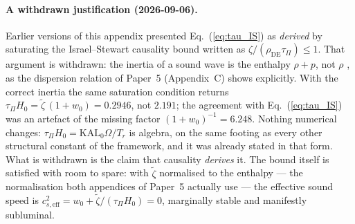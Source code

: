 \paragraph{A withdrawn justification (2026-09-06).}
Earlier versions of this appendix presented Eq.~(\ref{eq:tau_IS}) as
\emph{derived} by saturating the Israel--Stewart causality bound written as
$\zeta/(\rho_{\mathrm{DE}}\tau_{\Pi}) \le 1$. That argument is withdrawn: the
inertia of a sound wave is the enthalpy $\rho+p$, not $\rho$
\citep{Maartens1996,HiscockLindblom1985}, as the dispersion relation of
Paper~5 (Appendix~C) shows explicitly. With the correct inertia the same
saturation condition returns $\tau_{\Pi}H_{0} = \tilde\zeta\,(1+w_{0}) =
0.2946$, not $2.191$; the agreement with Eq.~(\ref{eq:tau_IS}) was an artefact
of the missing factor $(1+w_{0})^{-1} = 6.248$.
%
Nothing numerical changes: $\tau_{\Pi}H_{0} = \mathrm{KAL}_{0}\Omega/T_{r}$ is
algebra, on the same footing as every other structural constant of the
framework, and it was already stated in that form. What is withdrawn is the
claim that causality \emph{derives} it. The bound itself is satisfied with
room to spare: with $\tilde\zeta$ normalised to the enthalpy --- the
normalisation both appendices of Paper~5 actually use --- the effective sound
speed is $c^{2}_{s,\mathrm{eff}} = w_{0} + \tilde\zeta/(\tau_{\Pi}H_{0}) = 0$,
marginally stable and manifestly subluminal.

